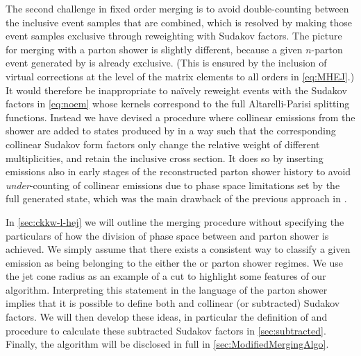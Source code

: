The second challenge in fixed order
  merging is to avoid double-counting between the inclusive event
  samples that are combined, which is resolved by making those event
  samples exclusive through reweighting with Sudakov factors.  The
  picture for merging \HEJ with a parton shower is slightly different,
  because a given $n$-parton event generated by \HEJ is already
  exclusive. (This is ensured by the inclusion of virtual corrections
  at the level of the matrix elements to all orders in
  \cref{eq:MHEJ}.)  It would therefore be inappropriate to na\"ively
  reweight events with the Sudakov factors in \cref{eq:noem} whose kernels correspond to
  the full Altarelli-Parisi splitting functions.
%
Instead we have devised a procedure where
  collinear emissions from the shower are added to states produced by
  \HEJ in a way such that the corresponding collinear Sudakov form factors only
  change the relative weight of different \HEJ multiplicities, and retain the
  inclusive cross section. It does so by inserting emissions also in
  early stages of the reconstructed parton shower history to avoid
  \textit{under}-counting of collinear emissions due to phase space
  limitations set by the full generated \HEJ state, which was the main
  drawback of the previous approach in \cite{Andersen:2011zd}.

In \cref{sec:ckkw-l-hej} we will outline the merging procedure without specifying the particulars of how the division of phase space
between \HEJ and parton shower is achieved. We simply assume that there exists a consistent way to classify a given emission as being 
belonging to the either the \HEJ or parton shower regimes. 
We use the jet cone radius as an example of a cut 
to highlight some features of our algorithm.
Interpreting this statement in the language of the parton shower
implies that it is possible to define both \HEJ and collinear (or subtracted) Sudakov factors. 
We will then develop these ideas, in particular the
definition of and procedure to calculate these subtracted Sudakov factors in \cref{sec:subtracted}.
Finally, the algorithm will be disclosed in full in \cref{sec:ModifiedMergingAlgo}.



